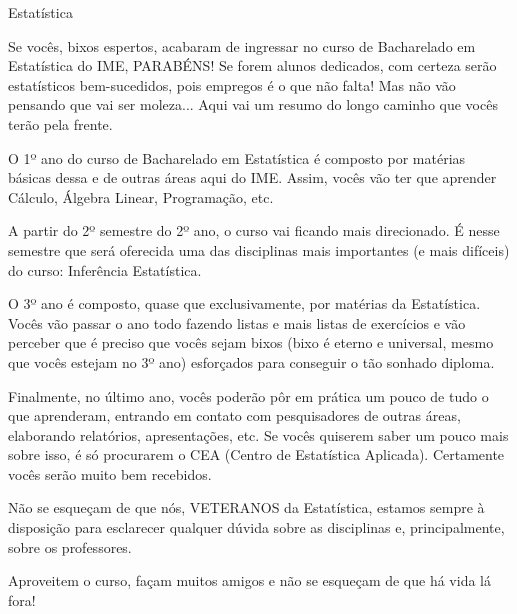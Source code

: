 \begin{subsecao}{Estatística}

Se vocês, bixos espertos, acabaram de ingressar no curso de Bacharelado em
Estatística do IME, PARABÉNS! Se forem alunos dedicados, com certeza serão
estatísticos bem-sucedidos, pois empregos é o que não falta! Mas não vão
pensando que vai ser moleza... Aqui vai um resumo do longo caminho que vocês
terão pela frente.

O 1º ano do curso de Bacharelado em Estatística é composto por matérias básicas
dessa e de outras áreas aqui do IME. Assim, vocês vão ter que aprender Cálculo,
Álgebra Linear, Programação, etc.

A partir do 2º semestre do 2º ano, o curso vai ficando mais direcionado. É nesse
semestre que será oferecida uma das disciplinas mais importantes (e mais
difíceis) do curso: Inferência Estatística.

O 3º ano é composto, quase que exclusivamente, por matérias da
Estatística. Vocês vão passar o ano todo fazendo listas e mais listas de
exercícios e vão perceber que é preciso que vocês sejam bixos (bixo é eterno e
universal, mesmo que vocês estejam no 3º ano) esforçados para conseguir o tão
sonhado diploma.

Finalmente, no último ano, vocês poderão pôr em prática um pouco de tudo o que
aprenderam, entrando em contato com pesquisadores de outras áreas, elaborando
relatórios, apresentações, etc. Se vocês quiserem saber um pouco mais sobre
isso, é só procurarem o CEA (Centro de Estatística Aplicada). Certamente vocês
serão muito bem recebidos.

Não se esqueçam de que nós, VETERANOS da Estatística, estamos sempre à
disposição para esclarecer qualquer dúvida sobre as disciplinas e,
principalmente, sobre os professores.

Aproveitem o curso, façam muitos amigos e não se esqueçam de que há vida lá
fora!

\end{subsecao}
